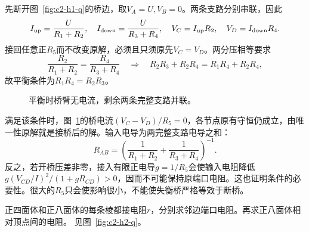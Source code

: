 \begin{solution}
先断开图~\ref{fig:c2-h1-q}的桥边，取$V_A=U,V_B=0$。两条支路分别串联，因此
\[
 I_{\rm up}=\frac{U}{R_1+R_2},\quad
 I_{\rm down}=\frac{U}{R_3+R_4},\quad
 V_C=I_{\rm up}R_2,\quad V_D=I_{\rm down}R_4.
\]
接回任意正$R_5$而不改变原解，必须且只须原先$V_C=V_D$。两分压相等要求
\[
 \frac{R_2}{R_1+R_2}=\frac{R_4}{R_3+R_4}
 \quad\Rightarrow\quad R_2R_3+R_2R_4=R_1R_4+R_2R_4,
\]
故平衡条件为$\boxed{R_1R_4=R_2R_3}$。
\begin{figure}[H]\centering
{}
\caption{平衡时桥臂无电流，剩余两条完整支路并联。}\label{fig:c2-h1-s}
\end{figure}
满足该条件时，图~\ref{fig:c2-h1-s}的桥电流$(V_C-V_D)/R_5=0$，各节点原有守恒仍成立，由唯一性原解就是接桥后的解。输入电导为两完整支路电导之和：
\[
 \boxed{R_{AB}=\left(\frac1{R_1+R_2}+\frac1{R_3+R_4}\right)^{-1}}.
\]
反之，若开桥压差非零，接入有限正电导$g=1/R_5$会使输入电阻降低$g(V_{CD}/I)^2/(1+gR_{CD})>0$，因而不可能保持原端口电阻。这也证明条件的必要性。很大的$R_5$只会使影响很小，不能使失衡桥严格等效于断桥。
\end{solution}

\begin{exercise}[正四面体与正八面体的邻边]\label{ex:c2-h2}
正四面体和正八面体的每条棱都接电阻$r$，分别求邻边端口电阻。再求正八面体相对顶点间的电阻。 见图~\ref{fig:c2-h2-q}。
\end{exercise}


